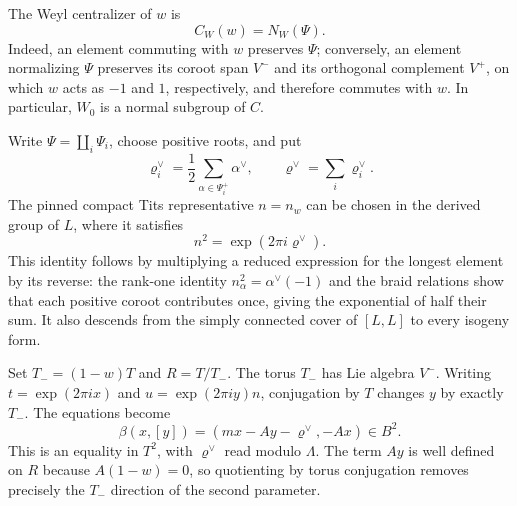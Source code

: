 \documentclass[11pt,a4paper,reqno]{amsart}
\theoremstyle{plain}
\theoremstyle{definition}
\theoremstyle{remark}
\numberwithin{equation}{section}
\newcommand{\rh}{\varrho^\vee}
\newcommand{\eexp}[1]{\exp(2\pi i #1)}
\begin{document}
The Weyl centralizer of $w$ is
\begin{equation}\label{eq:normalizer}
C_W(w)=N_W(\Psi).
\end{equation}
Indeed, an element commuting with $w$ preserves $\Psi$; conversely, an element normalizing $\Psi$ preserves its coroot span $V^-$ and its orthogonal complement $V^+$, on which $w$ acts as $-1$ and $1$, respectively, and therefore commutes with $w$. In particular, $W_0$ is a normal subgroup of $C$.

Write $\Psi=\coprod_i\Psi_i$, choose positive roots, and put
\[
\rh_i=\frac12\sum_{\alpha\in\Psi_i^+}\alpha^\vee, \qquad \rh=\sum_i\rh_i.
\]
The pinned compact Tits representative $n=n_w$ can be chosen in the derived group of $L$, where it satisfies~\cite[Lemma~5.1]{adams}
\begin{equation}\label{eq:tits}
n^2=\eexp{\rh}.
\end{equation}
This identity follows by multiplying a reduced expression for the longest element by its reverse: the rank-one identity $n_\alpha^2=\alpha^\vee(-1)$ and the braid relations show that each positive coroot contributes once, giving the exponential of half their sum. It also descends from the simply connected cover of $[L,L]$ to every isogeny form.

Set $T_-=(1-w)T$ and $R=T/T_-$. The torus $T_-$ has Lie algebra $V^-$. Writing $t=\eexp{x}$ and $u=\eexp{y}n$, conjugation by $T$ changes $y$ by exactly $T_-$. The equations become
\begin{equation}\label{eq:beta}
\beta(x,[y])=(mx-Ay-\rh,-Ax)\in B^2.
\end{equation}
This is an equality in $T^2$, with $\rh$ read modulo $\Lambda$. The term $Ay$ is well defined on $R$ because $A(1-w)=0$, so quotienting by torus conjugation removes precisely the $T_-$ direction of the second parameter.
\end{document}
